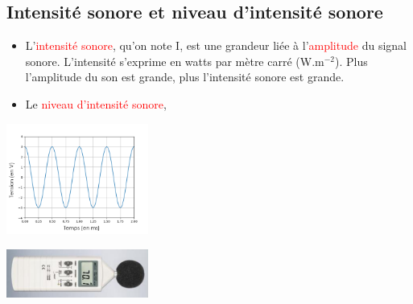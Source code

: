\subsection{Intensité sonore et niveau d'intensité sonore}
\begin{tcolorbox}[colback=green!5!white,colframe=green!75!black,title=\textbf{Définition :}]
\begin{multicols}{2}
\begin{itemize}[label=\textbullet]
    \item L'\textcolor{red}{intensité sonore}, qu'on note I, est une grandeur liée à l'\textcolor{red}{amplitude} du signal sonore. L'intensité s'exprime en watts par mètre carré (W.m$^{-2}$). Plus l'amplitude du son est grande, plus l'intensité sonore est grande.
    \item Le \textcolor{red}{niveau d'intensité sonore},%
    \end{itemize}
    \vspace{3cm}

\begin{center}
    \includegraphics[width=0.35\textwidth]{Images/Signal_diapason.PNG}
\end{center}
\begin{center}
    \includegraphics[width=0.35\textwidth]{Images/Sonometre.PNG}
\end{center}
\end{multicols}
\end{tcolorbox}

